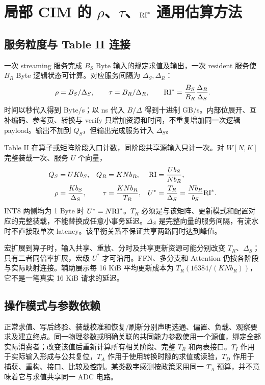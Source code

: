 \section{\texorpdfstring{局部 CIM 的 $\rho$、$\tau$、$\mathrm{RI}^*$ 通用估算方法}{局部 CIM 的两路服务估算}}

\subsection{服务粒度与 Table II 连接}

一次 streaming 服务完成 $B_S$ Byte 输入的规定求值及输出，一次 resident 服务使 $B_R$ Byte 逻辑状态可计算。对应服务间隔为 $\Delta_S,\Delta_R$：
\begin{equation}
\rho=B_S/\Delta_S,\qquad\tau=B_R/\Delta_R,\qquad
\mathrm{RI}^*=\frac{B_S}{B_R}\frac{\Delta_R}{\Delta_S}.
\label{eq:service}
\end{equation}
时间以秒代入得到 Byte/s；以 ns 代入 $B/\Delta$ 得到十进制 GB/s。内部位展开、互补编码、参考页、转换与 verify 只增加资源和时间，不重复增加同一次逻辑 payload。输出不加到 $Q_S$，但输出完成服务计入 $\Delta_S$。

Table II 在算子或矩阵阶段入口计数，同阶段共享源输入只计一次。对 $W[N,K]$ 完整装载一次、服务 $U$ 个向量，
\begin{equation}
\begin{aligned}
Q_S&=UKb_S,& Q_R&=KNb_R,& \mathrm{RI}&=\frac{Ub_S}{Nb_R},\\
\rho&=\frac{Kb_S}{\Delta_S},&\tau&=\frac{KNb_R}{T_R},&
U^*&=\frac{T_R}{\Delta_S}=\frac{Nb_R}{b_S}\mathrm{RI}^*.
\end{aligned}
\label{eq:mapping}
\end{equation}
INT8 两侧均为 1 Byte 时 $U^*=N\mathrm{RI}^*$。$T_R$ 必须是与该矩阵、更新模式和配置对应的完整装载，不能替换成任意小事务延迟。$\Delta_S$ 是完整向量的服务间隔，有流水时不直接取单次 latency。该平衡关系不保证共享两路同时达到峰值。

宏扩展到算子时，输入共享、重放、分时及共享更新资源可能分别改变 $T_R$、$\Delta_S$；只有二者同倍率扩展，宏级 $U^*$ 才可沿用。FFN、多分支和 Attention 仍按各阶段与实际映射连接。辅助展示每 16 KiB 平均更新成本为 $T_R(16384/(KNb_R))$，它不是一笔真实 16 KiB 请求的延迟。

\subsection{操作模式与参数依赖}

正常求值、写后终验、装载校准和恢复/刷新分别声明选通、偏置、负载、观察要求及建立终点。同一物理参数或明确关联的共同能力参数使用一个源值，绑定全部实际消费者；改变该值后重新计算所有相关阶段、完整 $T_R$ 和两表接口。$T_I$ 作用于实际输入形成与公共复位，$T_A$ 作用于使用转换时隙的求值或读验，$T_D$ 作用于捕获、重构、接口、比较及控制。某类数字感测按政策采用同一 $T_A$ 预算，并不意味着它与求值共享同一 ADC 电路。

